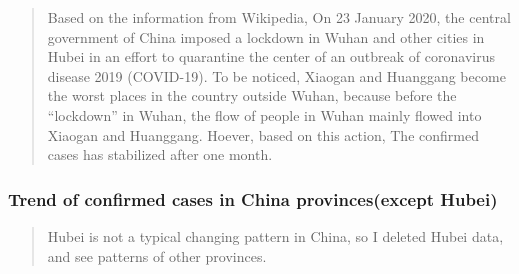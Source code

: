 \documentclass[12pt,]{article}
\newenvironment{Shaded}{\begin{snugshade}}{\end{snugshade}}
\newcommand{\CommentTok}[1]{\textcolor[rgb]{0.56,0.35,0.01}{\textit{#1}}}
\newcommand{\DataTypeTok}[1]{\textcolor[rgb]{0.13,0.29,0.53}{#1}}
\newcommand{\KeywordTok}[1]{\textcolor[rgb]{0.13,0.29,0.53}{\textbf{#1}}}
\newcommand{\NormalTok}[1]{#1}
\newcommand{\OperatorTok}[1]{\textcolor[rgb]{0.81,0.36,0.00}{\textbf{#1}}}
\newcommand{\OtherTok}[1]{\textcolor[rgb]{0.56,0.35,0.01}{#1}}
\newcommand{\StringTok}[1]{\textcolor[rgb]{0.31,0.60,0.02}{#1}}
\begin{document}
\begin{quote}
Based on the information from Wikipedia, On 23 January 2020, the central
government of China imposed a lockdown in Wuhan and other cities in
Hubei in an effort to quarantine the center of an outbreak of
coronavirus disease 2019 (COVID-19). To be noticed, Xiaogan and
Huanggang become the worst places in the country outside Wuhan, because
before the ``lockdown'' in Wuhan, the flow of people in Wuhan mainly
flowed into Xiaogan and Huanggang. Hoever, based on this action, The
confirmed cases has stabilized after one month.
\end{quote}

\hypertarget{trend-of-confirmed-cases-in-china-provincesexcept-hubei}{%
\subsubsection{Trend of confirmed cases in China provinces(except
Hubei)}\label{trend-of-confirmed-cases-in-china-provincesexcept-hubei}}

\begin{quote}
Hubei is not a typical changing pattern in China, so I deleted Hubei
data, and see patterns of other provinces.
\end{quote}

\begin{Shaded}
\end{Shaded}
\end{document}
